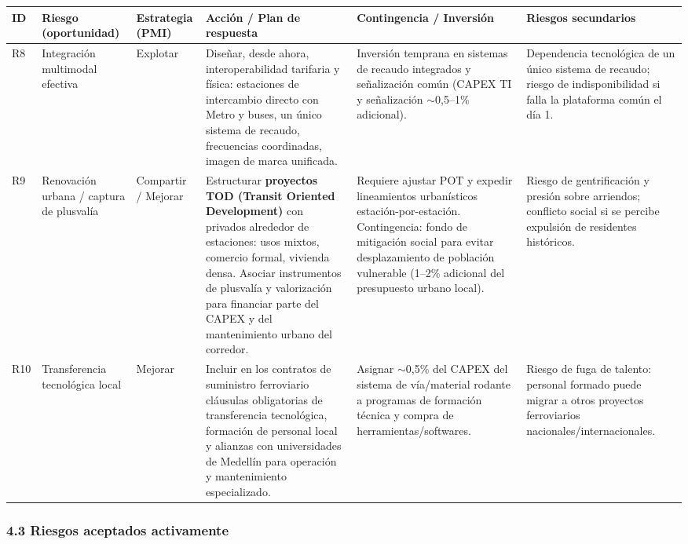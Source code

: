\begin{table}[H]\centering\small
\begin{tabular}{p{1cm}p{2cm}p{1.5cm}p{3.5cm}p{3cm}p{3.5cm}}
\toprule
\textbf{ID} & \textbf{Riesgo (oportunidad)} & \textbf{Estrategia (PMI)} & \textbf{Acción / Plan de respuesta} & \textbf{Contingencia / Inversión} & \textbf{Riesgos secundarios} \\
\midrule
R8 & Integración multimodal efectiva & Explotar & 
Diseñar, desde ahora, interoperabilidad tarifaria y física: estaciones de intercambio directo con Metro y buses, un único sistema de recaudo, frecuencias coordinadas, imagen de marca unificada. 
&
Inversión temprana en sistemas de recaudo integrados y señalización común (CAPEX TI y señalización $\sim$0{,}5--1\% adicional). 
&
Dependencia tecnológica de un único sistema de recaudo; riesgo de indisponibilidad si falla la plataforma común el día 1. \\
\midrule
R9 & Renovación urbana / captura de plusvalía & Compartir / Mejorar & 
Estructurar \textbf{proyectos TOD (Transit Oriented Development)} con privados alrededor de estaciones: usos mixtos, comercio formal, vivienda densa. Asociar instrumentos de plusvalía y valorización para financiar parte del CAPEX y del mantenimiento urbano del corredor. 
&
Requiere ajustar POT y expedir lineamientos urbanísticos estación-por-estación. Contingencia: fondo de mitigación social para evitar desplazamiento de población vulnerable (1--2\% adicional del presupuesto urbano local). 
&
Riesgo de gentrificación y presión sobre arriendos; conflicto social si se percibe expulsión de residentes históricos. \\
\midrule
R10 & Transferencia tecnológica local & Mejorar & 
Incluir en los contratos de suministro ferroviario cláusulas obligatorias de transferencia tecnológica, formación de personal local y alianzas con universidades de Medellín para operación y mantenimiento especializado. 
&
Asignar $\sim$0{,}5\% del CAPEX del sistema de vía/material rodante a programas de formación técnica y compra de herramientas/softwares. 
&
Riesgo de fuga de talento: personal formado puede migrar a otros proyectos ferroviarios nacionales/internacionales. \\
\bottomrule
\end{tabular}
\end{table}

\subsubsection*{4.3 Riesgos aceptados activamente}

